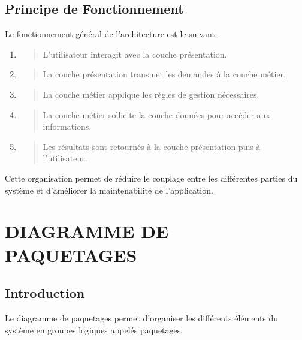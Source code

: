 \hypertarget{principe-de-fonctionnement}{%
\section{Principe de Fonctionnement}\label{principe-de-fonctionnement}}

Le fonctionnement général de l'architecture est le suivant :

\begin{enumerate}
\def\labelenumi{\arabic{enumi}.}
\item
  \begin{quote}
  L'utilisateur interagit avec la couche présentation.
  \end{quote}
\item
  \begin{quote}
  La couche présentation transmet les demandes à la couche métier.
  \end{quote}
\item
  \begin{quote}
  La couche métier applique les règles de gestion nécessaires.
  \end{quote}
\item
  \begin{quote}
  La couche métier sollicite la couche données pour accéder aux
  informations.
  \end{quote}
\item
  \begin{quote}
  Les résultats sont retournés à la couche présentation puis à
  l'utilisateur.
  \end{quote}
\end{enumerate}

Cette organisation permet de réduire le couplage entre les différentes
parties du système et d'améliorer la maintenabilité de l'application.

\hypertarget{chapitre-3-diagramme-de-paquetages}{%
\chapter{DIAGRAMME DE PAQUETAGES}\label{chapitre-3-diagramme-de-paquetages}}

\hypertarget{introduction-1}{%
\section{Introduction}\label{introduction-1}}

Le diagramme de paquetages permet d'organiser les différents éléments du
système en groupes logiques appelés paquetages.

